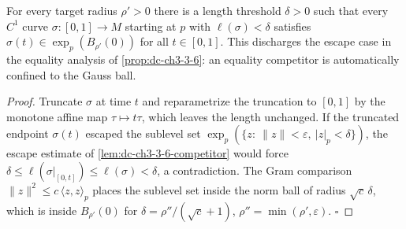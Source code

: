 \begin{lemma}
  \label{lem:dc-ch3-3-6-confinement}
  \leanok
  For every target radius $\rho'>0$ there is a length threshold $\delta>0$
  such that every $C^1$ curve $\sigma:[0,1]\to M$ starting at $p$ with
  $\ell(\sigma)<\delta$ satisfies $\sigma(t)\in\exp_p(B_{\rho'}(0))$ for all
  $t\in[0,1]$. This discharges the escape case in the equality analysis of
  \cref{prop:dc-ch3-3-6}: an equality competitor is automatically confined
  to the Gauss ball.
\end{lemma}
\begin{proof}
  \leanok
  Truncate $\sigma$ at time $t$ and reparametrize the truncation to $[0,1]$
  by the monotone affine map $\tau\mapsto t\tau$, which leaves the length
  unchanged. If the truncated endpoint $\sigma(t)$ escaped the sublevel set
  $\exp_p(\{z:\ \|z\|<\varepsilon,\ |z|_p<\delta\})$, the escape estimate of
  \cref{lem:dc-ch3-3-6-competitor} would force
  $\delta\le\ell(\sigma|_{[0,t]})\le\ell(\sigma)<\delta$, a contradiction.
  The Gram comparison $\|z\|^2\le c\,\langle z,z\rangle_p$ places the
  sublevel set inside the norm ball of radius $\sqrt{c}\,\delta$, which is
  inside $B_{\rho'}(0)$ for $\delta=\rho''/(\sqrt{c}+1)$,
  $\rho''=\min(\rho',\varepsilon)$. $\square$
\end{proof}

